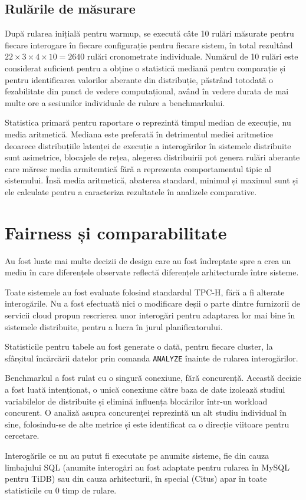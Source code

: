 \subsection{Rulările de măsurare}

După rularea inițială pentru warmup, se execută câte 10 rulări măsurate pentru fiecare interogare în fiecare configurație pentru fiecare sistem, în total rezultând $22 \times 3 \times 4 \times 10 = 2640$ rulări cronometrate individuale. Numărul de 10 rulări este considerat suficient pentru a obține o statistică mediană pentru comparație și pentru identificarea valorilor aberante din distribuție, păstrând totodată o fezabilitate din punct de vedere computațional, având în vedere durata de mai multe ore a sesiunilor individuale de rulare a benchmarkului.

Statistica primară pentru raportare o reprezintă timpul median de execuție, nu media aritmetică. Mediana este preferată în detrimentul mediei aritmetice deoarece distribuțiile latenței de execuție a interogărilor în sistemele distribuite sunt asimetrice, blocajele de rețea, alegerea distribuirii pot genera rulări aberante care măresc media armitemtică fără a reprezenta comportamentul tipic al sistemului. Însă media aritmetică, abaterea standard, minimul și maximul sunt și ele calculate pentru a caracteriza rezultatele în analizele comparative.

\section{Fairness și comparabilitate}

Au fost luate mai multe decizii de design care au fost îndreptate spre a crea un mediu în care diferențele observate reflectă diferențele arhitecturale între sisteme.

Toate sistemele au fost evaluate folosind standardul TPC-H, fără a fi alterate interogările. Nu a fost efectuată nici o modificare deșii o parte dintre furnizorii de servicii cloud propun rescrierea unor interogări pentru adaptarea lor mai bine în sistemele distribuite, pentru a lucra în jurul planificatorului.

Statisticile pentru tabele au fost generate o dată, pentru fiecare cluster, la sfârșitul încărcării datelor prin comanda \texttt{ANALYZE} înainte de rularea interogărilor.

Benchmarkul a fost rulat cu o singură conexiune, fără concurență. Această decizie a fost luată intenționat, o unică conexiune către baza de date izolează studiul variabilelor de distribuite și elimină influența blocărilor într-un workload concurent. O analiză asupra concurenței reprezintă un alt studiu individual în sine, folosindu-se de alte metrice și este identificat ca o direcție viitoare pentru cercetare.

Interogările ce nu au putut fi executate pe anumite sisteme, fie din cauza limbajului SQL (anumite interogări au fost adaptate pentru rularea în MySQL pentru TiDB) sau din cauza arhitecturii, în special (Citus) apar în toate statisticile cu 0 timp de rulare.
 